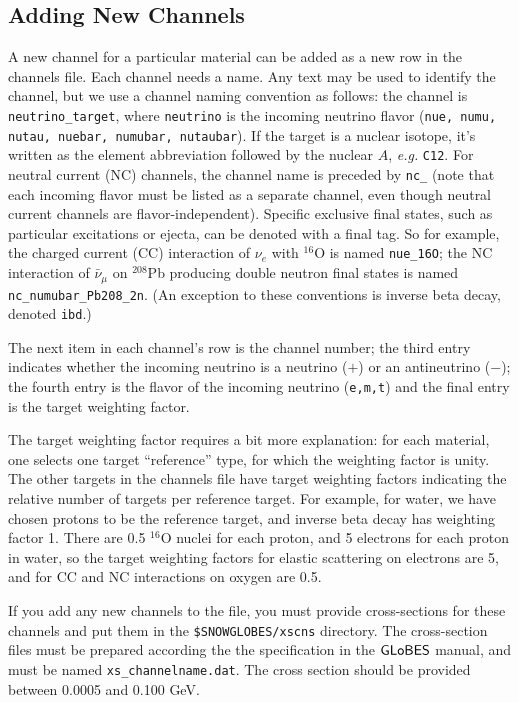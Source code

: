 \documentclass[12pt]{article}
\newcommand{\globes}{\sf{GLoBES}}
\begin{document}
\subsection{Adding New Channels}\label{addingchannel}
 A new channel for a particular material can be added as a new row in
 the channels file.  Each channel needs a name.  Any text may be used
 to identify the channel, but we use a channel naming convention as
 follows: the channel is \texttt{neutrino\_target}, where \texttt{neutrino}
 is the incoming neutrino flavor 
(\texttt{nue, numu, nutau, nuebar, numubar, nutaubar}).  If the target is a nuclear isotope,
 it's written as the element abbreviation followed by the nuclear $A$,
 \textit{e.g.} \texttt{C12}.  For neutral current (NC) channels, the
 channel name is preceded by \texttt{nc\_} (note that each incoming 
flavor must
 be listed as a separate channel, even though neutral current channels are
 flavor-independent).  Specific exclusive final states, such as
 particular excitations or ejecta, can be denoted with a final tag.
 So for example, the charged current (CC) interaction of $\nu_e$ with
 $^{16}$O is named \texttt{nue\_16O}; the NC
 interaction of  $\bar{\nu}_\mu$ on $^{208}$Pb producing double neutron
 final states is named \texttt{nc\_numubar\_Pb208\_2n}.  (An
 exception to these conventions is inverse beta decay, denoted
 \texttt{ibd}.)

The next item in each channel's row is the channel number; the third
entry indicates whether the incoming neutrino is a neutrino ($+$) or
an antineutrino ($-$); the fourth entry is the flavor of the incoming
neutrino (\texttt{e,m,t}) and the final entry is the target weighting
factor.

The target weighting factor requires a bit more explanation: for each
material, one selects one target ``reference'' type, for which the
weighting factor is unity.  The other targets in the channels file
have target weighting factors indicating the relative number of
targets per reference target.  For example, for water, we have chosen
protons to be the reference target, and inverse beta decay has
weighting factor 1. There are 0.5 $^{16}$O nuclei for each proton, and
5 electrons for each proton in water, so the target weighting factors
for elastic scattering on electrons are 5, and for CC and NC interactions on
oxygen are 0.5.

If you add any new channels to the file, you must provide
cross-sections for these channels and put them in the
\texttt{\$SNOWGLOBES/xscns} directory.  The cross-section files must
be prepared according the the specification in the $\globes$ manual,
and must be named \texttt{xs\_channelname.dat}.  The cross section should be provided between 0.0005 and 0.100 GeV.
\end{document}

